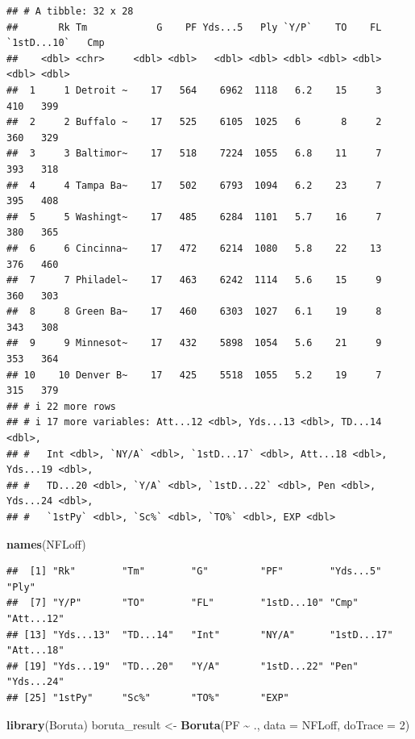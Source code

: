 \documentclass[
]{article}
\newenvironment{Shaded}{\begin{snugshade}}{\end{snugshade}}
\newcommand{\AttributeTok}[1]{\textcolor[rgb]{0.13,0.29,0.53}{#1}}
\newcommand{\DecValTok}[1]{\textcolor[rgb]{0.00,0.00,0.81}{#1}}
\newcommand{\FunctionTok}[1]{\textcolor[rgb]{0.13,0.29,0.53}{\textbf{#1}}}
\newcommand{\NormalTok}[1]{#1}
\newcommand{\OtherTok}[1]{\textcolor[rgb]{0.56,0.35,0.01}{#1}}
\newcommand{\SpecialCharTok}[1]{\textcolor[rgb]{0.81,0.36,0.00}{\textbf{#1}}}
\begin{document}
\begin{verbatim}
## # A tibble: 32 x 28
##       Rk Tm            G    PF Yds...5   Ply `Y/P`    TO    FL `1stD...10`   Cmp
##    <dbl> <chr>     <dbl> <dbl>   <dbl> <dbl> <dbl> <dbl> <dbl>       <dbl> <dbl>
##  1     1 Detroit ~    17   564    6962  1118   6.2    15     3         410   399
##  2     2 Buffalo ~    17   525    6105  1025   6       8     2         360   329
##  3     3 Baltimor~    17   518    7224  1055   6.8    11     7         393   318
##  4     4 Tampa Ba~    17   502    6793  1094   6.2    23     7         395   408
##  5     5 Washingt~    17   485    6284  1101   5.7    16     7         380   365
##  6     6 Cincinna~    17   472    6214  1080   5.8    22    13         376   460
##  7     7 Philadel~    17   463    6242  1114   5.6    15     9         360   303
##  8     8 Green Ba~    17   460    6303  1027   6.1    19     8         343   308
##  9     9 Minnesot~    17   432    5898  1054   5.6    21     9         353   364
## 10    10 Denver B~    17   425    5518  1055   5.2    19     7         315   379
## # i 22 more rows
## # i 17 more variables: Att...12 <dbl>, Yds...13 <dbl>, TD...14 <dbl>,
## #   Int <dbl>, `NY/A` <dbl>, `1stD...17` <dbl>, Att...18 <dbl>, Yds...19 <dbl>,
## #   TD...20 <dbl>, `Y/A` <dbl>, `1stD...22` <dbl>, Pen <dbl>, Yds...24 <dbl>,
## #   `1stPy` <dbl>, `Sc%` <dbl>, `TO%` <dbl>, EXP <dbl>
\end{verbatim}

\begin{Shaded}
\begin{Highlighting}[]
\FunctionTok{names}\NormalTok{(NFLoff)}
\end{Highlighting}
\end{Shaded}

\begin{verbatim}
##  [1] "Rk"        "Tm"        "G"         "PF"        "Yds...5"   "Ply"      
##  [7] "Y/P"       "TO"        "FL"        "1stD...10" "Cmp"       "Att...12" 
## [13] "Yds...13"  "TD...14"   "Int"       "NY/A"      "1stD...17" "Att...18" 
## [19] "Yds...19"  "TD...20"   "Y/A"       "1stD...22" "Pen"       "Yds...24" 
## [25] "1stPy"     "Sc%"       "TO%"       "EXP"
\end{verbatim}

\begin{Shaded}
\begin{Highlighting}[]
\FunctionTok{library}\NormalTok{(Boruta)}
\NormalTok{boruta\_result }\OtherTok{\textless{}{-}} \FunctionTok{Boruta}\NormalTok{(PF }\SpecialCharTok{\textasciitilde{}}\NormalTok{ ., }\AttributeTok{data =}\NormalTok{ NFLoff, }\AttributeTok{doTrace =} \DecValTok{2}\NormalTok{)}
\end{Highlighting}
\end{Shaded}
\end{document}
